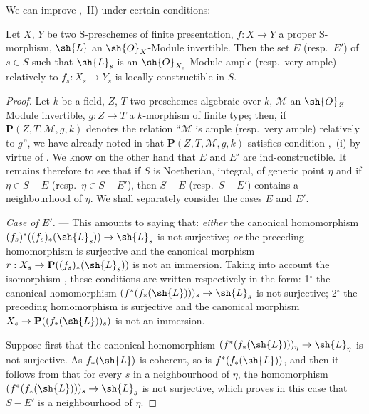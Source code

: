We can improve ,~II) under certain conditions:

\begin{proposition}[9.6.3]
\label{IV.9.6.3}
Let $X$, $Y$ be two S-preschemes of finite presentation, $f:X\to Y$ a proper S-morphism, $\sh{L}$ an $\sh{O}_X$-Module invertible.
Then the set $E$ (resp.\ $E'$) of $s\in S$ such that $\sh{L}_s$ is an $\sh{O}_{X_s}$-Module ample (resp.\ very ample) relatively to $f_s:X_s\to Y_s$ is locally constructible in $S$.
\end{proposition}

\begin{proof}
Let $k$ be a field, $Z$, $T$ two preschemes algebraic over $k$, $\mathscr{M}$ an $\sh{O}_Z$-Module invertible, $g:Z\to T$ a $k$-morphism of finite type; then, if $\mathbf{P}(Z,T,\mathscr{M},g,k)$ denotes the relation ``$\mathscr{M}$ is ample (resp.\ very ample) relatively to $g$'', we have already noted in  that $\mathbf{P}(Z,T,\mathscr{M},g,k)$ satisfies condition ,~(i) by virtue of .
We know on the other hand that $E$ and $E'$ are ind-constructible.
It remains therefore to see that if $S$ is Noetherian, integral, of generic point $\eta$ and if $\eta\in S-E$ (resp.\ $\eta\in S-E'$), then $S-E$ (resp.\ $S-E'$) contains a neighbourhood of $\eta$.
We shall separately consider the cases $E$ and $E'$.


\emph{Case of $E'$.} ---
This amounts to saying that: \emph{either} the canonical homomorphism $(f_s)^*((f_s)_*(\sh{L}_s))\to\sh{L}_s$ is not surjective; \emph{or} the preceding homomorphism is surjective and the canonical morphism $r:X_s\to\mathbf{P}((f_s)_*(\sh{L}_s))$ is not an immersion.
Taking into account the isomorphism , these conditions are written respectively in the form: 1$^\circ$ the canonical homomorphism $(f^*(f_*(\sh{L})))_s\to\sh{L}_s$ is not surjective; 2$^\circ$ the preceding homomorphism is surjective and the canonical morphism $X_s\to\mathbf{P}((f_*(\sh{L}))_s)$ is not an immersion.

Suppose first that the canonical homomorphism $(f^*(f_*(\sh{L})))_\eta\to\sh{L}_\eta$ is not surjective.
As $f_*(\sh{L})$ is coherent, so is $f^*(f_*(\sh{L}))$, and then it follows from  that for every $s$ in a neighbourhood of $\eta$, the homomorphism $(f^*(f_*(\sh{L})))_s\to\sh{L}_s$ is not surjective, which proves in this case that $S-E'$ is a neighbourhood of $\eta$.


\end{proof}
